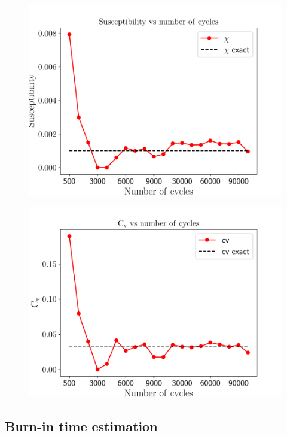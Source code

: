 \documentclass[english,notitlepage,reprint,nofootinbib]{revtex4-2}  %
\begin{document}
	\begin{figure}[h!]
		\centering
		\includegraphics[scale=0.55]{figures/chi_problem4.pdf}
		\caption{}
		\label{fig:chi4}
	\end{figure}

	\begin{figure}[h!]
		\centering
		\includegraphics[scale=0.55]{figures/CV_problem4.pdf}
		\caption{}
		\label{fig:cv4}
	\end{figure}

	\subsection{Burn-in time estimation}\label{subsec: burn in estimation}
\end{document}

